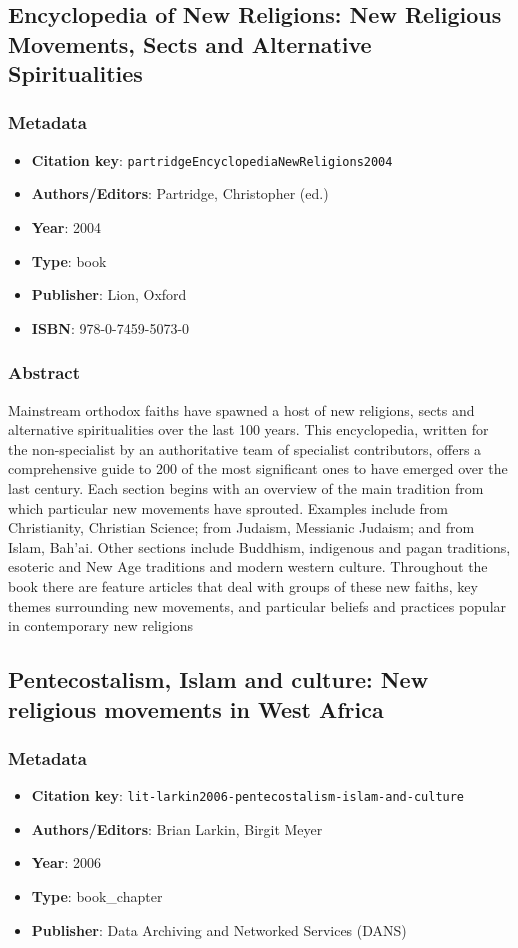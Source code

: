 \subsection{Encyclopedia of New Religions: New Religious Movements, Sects and Alternative Spiritualities}\label{lit:partridgeEncyclopediaNewReligions2004}
\subsubsection*{Metadata}
\begin{itemize}
  \item \textbf{Citation key}: \texttt{partridgeEncyclopediaNewReligions2004}
  \item \textbf{Authors/Editors}: Partridge, Christopher (ed.)
  \item \textbf{Year}: 2004
  \item \textbf{Type}: book
  \item \textbf{Publisher}: Lion, Oxford
  \item \textbf{ISBN}: 978-0-7459-5073-0
\end{itemize}
\subsubsection*{Abstract}
Mainstream orthodox faiths have spawned a host of new religions, sects and alternative spiritualities over the last 100 years. This encyclopedia, written for the non-specialist by an authoritative team of specialist contributors, offers a comprehensive guide to 200 of the most significant ones to have emerged over the last century. Each section begins with an overview of the main tradition from which particular new movements have sprouted. Examples include from Christianity, Christian Science; from Judaism, Messianic Judaism; and from Islam, Bah'ai. Other sections include Buddhism, indigenous and pagan traditions, esoteric and New Age traditions and modern western culture. Throughout the book there are feature articles that deal with groups of these new faiths, key themes surrounding new movements, and particular beliefs and practices popular in contemporary new religions

\subsection{Pentecostalism, Islam and culture: New religious movements in West Africa}\label{lit:lit-larkin2006-pentecostalism-islam-and-culture}
\subsubsection*{Metadata}
\begin{itemize}
  \item \textbf{Citation key}: \texttt{lit-larkin2006-pentecostalism-islam-and-culture}
  \item \textbf{Authors/Editors}: Brian Larkin, Birgit Meyer
  \item \textbf{Year}: 2006
  \item \textbf{Type}: book\_chapter
  \item \textbf{Publisher}: Data Archiving and Networked Services (DANS)
\end{itemize}
